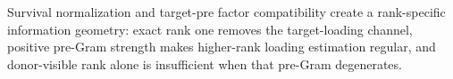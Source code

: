 Survival normalization and target-pre factor compatibility create a rank-specific information geometry: exact rank one removes the target-loading channel, positive pre-Gram strength makes higher-rank loading estimation regular, and donor-visible rank alone is insufficient when that pre-Gram degenerates.
